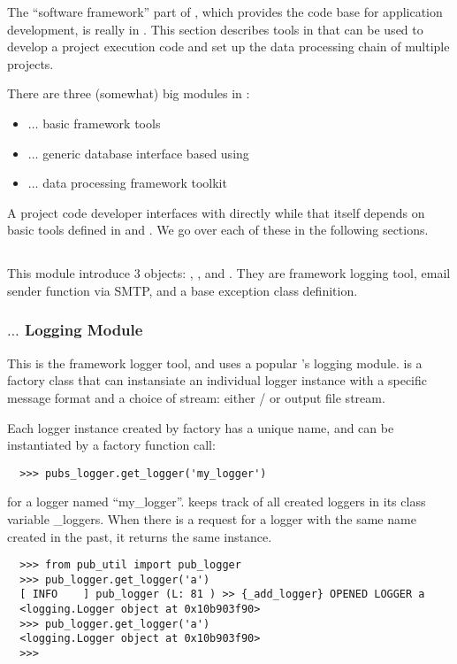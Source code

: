 The ``software framework'' part of {\pubs}, which provides the code base 
for application development, is really in {\python}. This section describes
 {\python} tools in {\pubs} that can be used to develop a project execution 
code and set up the data processing chain of multiple projects.

There are three (somewhat) big {\python} modules in {\pubs}:
\begin{itemize}
  \item {\pubutil} $\ldots$ basic framework tools
  \item {\pubdbi} $\ldots$ generic database interface based using {\psycopg}
  \item {\dstream} $\ldots$ data processing framework toolkit
\end{itemize}
A project code developer interfaces with {\dstream} directly while that itself 
depends on basic tools defined in {\pubutil} and {\pubdbi}. We go over each 
of these in the following sections. 

\subsection{{\pubutil}}
This module introduce 3 objects: {\publogger}, {\pubsmtp}, and {\pubexception}.
They are framework logging tool, email sender function via SMTP, and a base exception
class definition. 

\subsubsection{{\publogger} $\ldots$ Logging Module}
This is the framework logger tool, and uses a popular {\python}'s logging module.
{\publogger} is a factory class that can instansiate an individual logger instance
with a specific message format and a choice of stream: either {\stdout}/{\stderr} or
output file stream. 

Each logger instance created by {\publogger} factory has a unique name, and 
can be instantiated by a factory function call:
\begin{lstlisting}
  >>> pubs_logger.get_logger('my_logger')
\end{lstlisting}
for a logger named ``my\_logger''. {\publogger} keeps track of all created loggers 
in its class variable {\ttfamily \_loggers}. When there is a request for a logger
with the same name created in the past, it returns the same instance.
\begin{lstlisting}
  >>> from pub_util import pub_logger
  >>> pub_logger.get_logger('a')
  [ INFO    ] pub_logger (L: 81 ) >> {_add_logger} OPENED LOGGER a
  <logging.Logger object at 0x10b903f90>
  >>> pub_logger.get_logger('a')
  <logging.Logger object at 0x10b903f90>
  >>>
\end{lstlisting}


